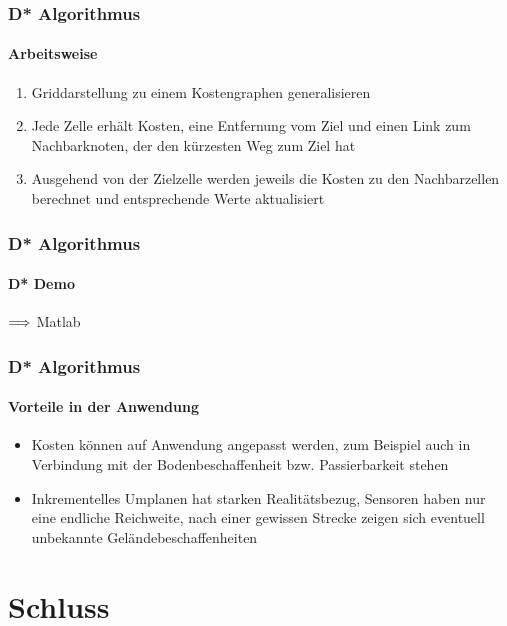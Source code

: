\documentclass{beamer}
\begin{document}
\begin{frame}
\frametitle{D* Algorithmus}
\framesubtitle{Arbeitsweise}

\begin{enumerate}
\item Griddarstellung zu einem Kostengraphen generalisieren

\item Jede Zelle erhält Kosten, eine Entfernung vom Ziel und einen Link zum Nachbarknoten, der den kürzesten Weg zum Ziel hat

\item Ausgehend von der Zielzelle werden jeweils die Kosten zu den Nachbarzellen berechnet und entsprechende Werte aktualisiert

\end{enumerate}



\begin{center}

\end{center}

\end{frame}

\begin{frame}
\frametitle{D* Algorithmus}
\framesubtitle{D* Demo}
\begin{center}
${\Huge \Longrightarrow}$ {\Large Matlab}
\end{center}
\end{frame}


\begin{frame}
\frametitle{D* Algorithmus}
\framesubtitle{Vorteile in der Anwendung}

\begin{itemize}
\item Kosten können auf Anwendung angepasst werden, zum Beispiel auch in Verbindung mit der Bodenbeschaffenheit bzw. Passierbarkeit stehen

\item Inkrementelles Umplanen hat starken Realitätsbezug, Sensoren haben nur eine endliche Reichweite, nach einer gewissen Strecke zeigen sich eventuell unbekannte Geländebeschaffenheiten

\end{itemize}

\end{frame}


\section{Schluss}
\end{document}
